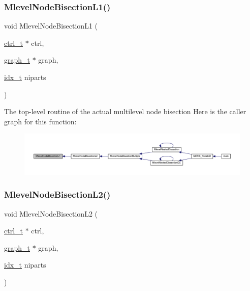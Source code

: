 \subsubsection{\texorpdfstring{Mlevel\+Node\+Bisection\+L1()}{MlevelNodeBisectionL1()}}
{\footnotesize\ttfamily void Mlevel\+Node\+Bisection\+L1 (\begin{DoxyParamCaption}\item[{\hyperlink{a00742}{ctrl\+\_\+t} $\ast$}]{ctrl,  }\item[{\hyperlink{a00734}{graph\+\_\+t} $\ast$}]{graph,  }\item[{\hyperlink{a00876_aaa5262be3e700770163401acb0150f52}{idx\+\_\+t}}]{niparts }\end{DoxyParamCaption})}

The top-\/level routine of the actual multilevel node bisection Here is the caller graph for this function\+:\nopagebreak
\begin{figure}[H]
\begin{center}
\leavevmode
\includegraphics[width=350pt]{a00933_aeeaa7f4ed9878ae2f7faff0e2402fd87_icgraph}
\end{center}
\end{figure}
\mbox{\label{a00933_ac3a0eaeefa34a3865a0be5bb70bd958f}} 
\subsubsection{\texorpdfstring{Mlevel\+Node\+Bisection\+L2()}{MlevelNodeBisectionL2()}}
{\footnotesize\ttfamily void Mlevel\+Node\+Bisection\+L2 (\begin{DoxyParamCaption}\item[{\hyperlink{a00742}{ctrl\+\_\+t} $\ast$}]{ctrl,  }\item[{\hyperlink{a00734}{graph\+\_\+t} $\ast$}]{graph,  }\item[{\hyperlink{a00876_aaa5262be3e700770163401acb0150f52}{idx\+\_\+t}}]{niparts }\end{DoxyParamCaption})}

